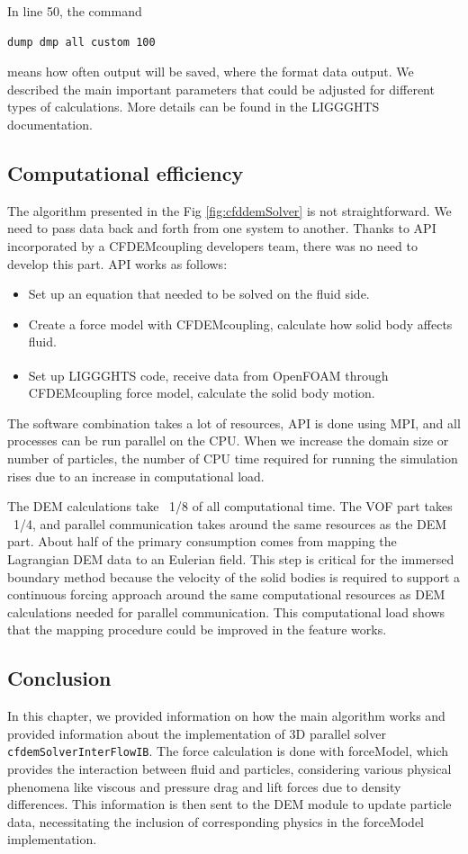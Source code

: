 In line 50, the command 
\begin{verbatim}
dump dmp all custom 100
\end{verbatim}
means how often output will be saved, where the format data output.
We described the main important parameters that could be adjusted for different types of calculations. More details can be found in the LIGGGHTS documentation.


\subsection{Computational efficiency}
The algorithm presented in the Fig \ref{fig:cfddemSolver} is not straightforward. We need to pass data back and forth from one system to another. Thanks to API incorporated by a CFDEMcoupling developers team, there was no need to develop this part. API works as follows: 
\begin{itemize}
    \item Set up an equation that needed to be solved on the fluid side.
    \item Create a force model with CFDEMcoupling, calculate how solid body affects fluid.
    \item Set up LIGGGHTS\textsuperscript{\textregistered} code, receive data from OpenFOAM\textsuperscript{\textregistered} through CFDEMcoupling force model, calculate the solid body motion.
\end{itemize}

The software combination takes a lot of resources, API is done using MPI, and all processes can be run parallel on the CPU. When we increase the domain size or number of particles, the number of CPU time required for running the simulation rises due to an increase in computational load.

The DEM calculations take ~1/8 of all computational time. The VOF part takes ~1/4, and parallel communication takes around the same resources as the DEM part. About half of the primary consumption comes from mapping the Lagrangian DEM data to an Eulerian field. This step is critical for the immersed boundary method because the velocity of the solid bodies is required to support a continuous forcing approach around the same computational resources as DEM calculations needed for parallel communication. This computational load shows that the mapping procedure could be improved in the feature works.

\subsection{Conclusion}
In this chapter, we provided information on how the main algorithm works and provided information about the implementation of 3D parallel solver \verb|cfdemSolverInterFlowIB|. The force calculation is done with forceModel, which provides the interaction between fluid and particles, considering various physical phenomena like viscous and pressure drag and lift forces due to density differences. This information is then sent to the DEM module to update particle data, necessitating the inclusion of corresponding physics in the forceModel implementation.

